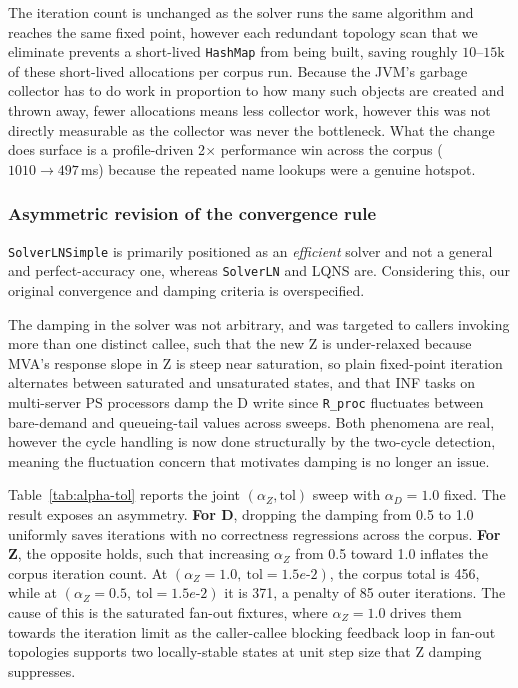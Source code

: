 The iteration count is unchanged as the solver runs the same algorithm and reaches the same fixed point, however each redundant topology scan that we eliminate prevents a short-lived \texttt{HashMap} from being built, saving roughly $10$--$15$k of these short-lived allocations per corpus run. Because the JVM's garbage collector has to do work in proportion to how many such objects are created and thrown away, fewer allocations means less collector work, however this was not directly measurable as the collector was never the bottleneck. What the change does surface is a profile-driven 2$\times$ performance win across the corpus ($1010 \rightarrow 497$\,ms) because the repeated name lookups were a genuine hotspot. 

\subsubsection*{Asymmetric revision of the convergence rule}

\texttt{SolverLNSimple} is primarily positioned as an \emph{efficient} solver and not a general and perfect-accuracy one, whereas \texttt{SolverLN} and LQNS are. Considering this, our original convergence and damping criteria is overspecified. 

The damping in the solver was not arbitrary, and was targeted to callers invoking more than one distinct callee, such that the new Z is under-relaxed because MVA's response slope in Z is steep near saturation, so plain fixed-point iteration alternates between saturated and unsaturated states, and that INF tasks on multi-server PS processors damp the D write since \texttt{R\_proc} fluctuates between bare-demand and queueing-tail values across sweeps. Both phenomena are real, however the cycle handling is now done structurally by the two-cycle detection, meaning the fluctuation concern that motivates damping is no longer an issue.

Table~\ref{tab:alpha-tol} reports the joint $(\alpha_Z, \text{tol})$ sweep with $\alpha_D = 1.0$ fixed. The result exposes an asymmetry. \textbf{For D}, dropping the damping from 0.5 to 1.0 uniformly saves iterations with no correctness regressions across the corpus. \textbf{For Z}, the opposite holds, such that increasing $\alpha_Z$ from 0.5 toward 1.0 inflates the corpus iteration count. At $(\alpha_Z = 1.0,\ \text{tol} = 1.5e\text{-}2)$, the corpus total is 456, while at $(\alpha_Z = 0.5,\ \text{tol} = 1.5e\text{-}2)$ it is 371, a penalty of 85 outer iterations. The cause of this is the saturated fan-out fixtures, where $\alpha_Z = 1.0$ drives them towards the iteration limit as the caller-callee blocking feedback loop in fan-out topologies supports two locally-stable states at unit step size that Z damping suppresses.


